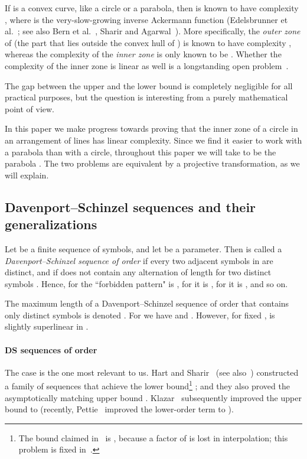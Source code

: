 \documentclass[11pt]{article}
\theoremstyle{definition}
\theoremstyle{remark}
\begin{document}
If  is a convex curve, like a circle or a parabola, then  is known to have complexity , where  is the very-slow-growing inverse Ackermann function (Edelsbrunner et al.~\cite{EGPPSS}; see also Bern et al.~\cite{BEPY}, Sharir and Agarwal~\cite{DS_book}). More specifically, the \emph{outer zone} of  (the part that lies outside the convex hull of ) is known to have complexity , whereas the complexity of the \emph{inner zone} is only known to be . Whether the complexity of the inner zone is linear as well is a longstanding open problem~\cite{BEPY, DS_book}.

The gap between the upper and the lower bound is completely negligible for all practical purposes, but the question is interesting from a purely mathematical point of view.

In this paper we make progress towards proving that the inner zone of a circle in an arrangement of lines has linear complexity. Since we find it easier to work with a parabola than with a circle, throughout this paper we will take  to be the parabola . The two problems are equivalent by a projective transformation, as we will explain.

\subsection{Davenport--Schinzel sequences and their generalizations}

Let  be a finite sequence of symbols, and let  be a parameter. Then  is called a \emph{Davenport--Schinzel sequence of order } if every two adjacent symbols in  are distinct, and if  does not contain any alternation  of length  for two distinct symbols . Hence, for  the ``forbidden pattern" is , for  it is , for  it is , and so on.

The maximum length of a Davenport--Schinzel sequence of order  that contains only  distinct symbols is denoted . For  we have  and . However, for fixed ,  is slightly superlinear in .

\paragraph{DS sequences of order }
The case  is the one most relevant to us. Hart and Sharir~\cite{HS} (see also~\cite{yo_DS,DS_book}) constructed a family of sequences that achieve the lower bound\footnote{The bound claimed in~\cite{DS_book} is , because a factor of  is lost in interpolation; this problem is fixed in~\cite{yo_DS}.} ; and they also proved the asymptotically matching upper bound . Klazar~\cite{klazar} subsequently improved the upper bound to  (recently, Pettie~\cite{pettie_sharp} improved the lower-order term to ).
\end{document}
